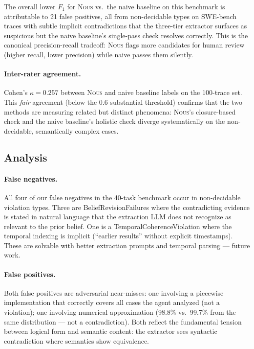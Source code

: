 \documentclass[11pt]{article}
\newcommand{\nous}{\textsc{Nous}} %
\begin{document}
The overall lower $F_1$ for \nous{} vs.\ the naive baseline on this
benchmark is attributable to 21 false positives, all from non-decidable
types on SWE-bench traces with subtle implicit contradictions that the
three-tier extractor surfaces as suspicious but the naive baseline's
single-pass check resolves correctly. This is the canonical
precision-recall tradeoff: \nous{} flags more candidates for human
review (higher recall, lower precision) while naive passes them silently.

\paragraph{Inter-rater agreement.}
Cohen's $\kappa = 0.257$ between \nous{} and naive baseline labels
on the 100-trace set. This \emph{fair} agreement (below the 0.6
substantial threshold) confirms that the two methods are measuring
related but distinct phenomena: \nous{}'s closure-based check
and the naive baseline's holistic check diverge systematically
on the non-decidable, semantically complex cases.

\subsection{Analysis}
\label{sec:analysis}

\paragraph{False negatives.}
All four of our false negatives in the 40-task benchmark occur in non-decidable violation types.
Three are BeliefRevisionFailures where the contradicting evidence is
stated in natural language that the extraction LLM does not recognize
as relevant to the prior belief. One is a TemporalCoherenceViolation
where the temporal indexing is implicit (``earlier results'' without
explicit timestamps). These are solvable with better extraction prompts
and temporal parsing — future work.

\paragraph{False positives.}
Both false positives are adversarial near-misses: one involving a
piecewise implementation that correctly covers all cases the agent
analyzed (not a violation); one involving numerical approximation
(98.8\% vs.\ 99.7\% from the same distribution — not a contradiction).
Both reflect the fundamental tension between logical form and semantic
content: the extractor sees syntactic contradiction where semantics
show equivalence.
\end{document}
